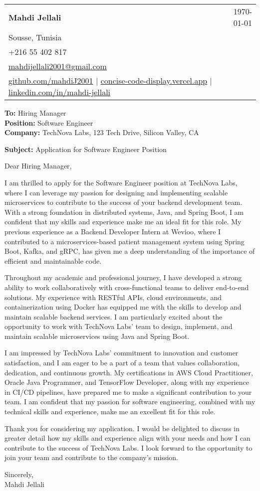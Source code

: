 \documentclass[letterpaper,11pt]{article}
\makeatletter
\newcommand{\letterHeading}[5]{
    \begin{tabular*}{\textwidth}{l@{\extracolsep{\fill}}r}
    \textbf{\Large #1} & #5 \\  %
    #2 & \\
    #3 & \\
    #4 & \\
    \end{tabular*}
    \vspace{15pt}
}
\newcommand{\letterRecipient}[3]{
    \textbf{\large To:} #1 \\
    \textbf{\large Position:} #2 \\
    \textbf{\large Company:} #3 \\
    \vspace{12pt}
}
\newcommand{\letterSubject}[1]{
    \textbf{\large Subject:} #1 \\
    \vspace{15pt}
}
\makeatother
\begin{document}
    \letterHeading
    {Mahdi Jellali}
    {Sousse, Tunisia}
    {+216 55 402 817 \\ \href{mailto:mahdijellali2001@gmail.com}{mahdijellali2001@gmail.com}}
    {\href{https://github.com/mahdiJ2001}{github.com/mahdiJ2001} $|$ \href{https://concise-code-display.vercel.app/}{concise-code-display.vercel.app} $|$ \href{https://www.linkedin.com/in/mahdi-jellali/}{linkedin.com/in/mahdi-jellali}}
    {\today}

    \letterRecipient
    {Hiring Manager}
    {Software Engineer}
    {TechNova Labs, 123 Tech Drive, Silicon Valley, CA}

    \letterSubject{Application for Software Engineer Position}

    Dear Hiring Manager,

    I am thrilled to apply for the Software Engineer position at TechNova Labs, where I can leverage my passion for designing and implementing scalable microservices to contribute to the success of your backend development team. With a strong foundation in distributed systems, Java, and Spring Boot, I am confident that my skills and experience make me an ideal fit for this role. My previous experience as a Backend Developer Intern at Wevioo, where I contributed to a microservices-based patient management system using Spring Boot, Kafka, and gRPC, has given me a deep understanding of the importance of efficient and maintainable code.

    Throughout my academic and professional journey, I have developed a strong ability to work collaboratively with cross-functional teams to deliver end-to-end solutions. My experience with RESTful APIs, cloud environments, and containerization using Docker has equipped me with the skills to develop and maintain scalable backend services. I am particularly excited about the opportunity to work with TechNova Labs' team to design, implement, and maintain scalable microservices using Java and Spring Boot.

    I am impressed by TechNova Labs' commitment to innovation and customer satisfaction, and I am eager to be a part of a team that values collaboration, dedication, and continuous growth. My certifications in AWS Cloud Practitioner, Oracle Java Programmer, and TensorFlow Developer, along with my experience in CI/CD pipelines, have prepared me to make a significant contribution to your team. I am confident that my passion for software engineering, combined with my technical skills and experience, make me an excellent fit for this role.

    Thank you for considering my application. I would be delighted to discuss in greater detail how my skills and experience align with your needs and how I can contribute to the success of TechNova Labs. I look forward to the opportunity to join your team and contribute to the company's mission.

    Sincerely,\\[12pt]

    Mahdi Jellali
\end{document}
